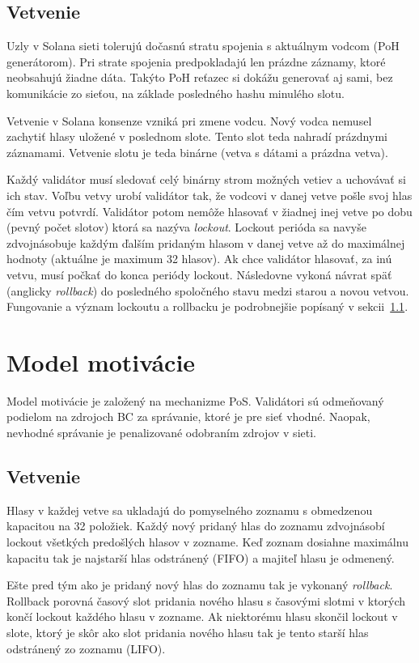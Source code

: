 \subsection{Vetvenie}
Uzly v Solana sieti tolerujú dočasnú stratu spojenia s aktuálnym vodcom (PoH generátorom). Pri strate spojenia predpokladajú len prázdne záznamy, ktoré neobsahujú žiadne dáta. Takýto PoH reťazec si dokážu generovať aj sami, bez komunikácie zo sieťou, na základe posledného hashu minulého slotu.

Vetvenie v Solana konsenze vzniká pri zmene vodcu. Nový vodca nemusel zachytiť hlasy uložené v poslednom slote. Tento slot teda nahradí prázdnymi záznamami. Vetvenie slotu je teda binárne (vetva s dátami a prázdna vetva). 

Každý validátor musí sledovať celý binárny strom možných vetiev a uchovávať si ich stav. Voľbu vetvy urobí validátor tak, že vodcovi v danej vetve pošle svoj hlas čím vetvu potvrdí. Validátor potom nemôže hlasovať v žiadnej inej vetve po dobu (pevný počet slotov) ktorá sa nazýva \textit{lockout}. Lockout perióda sa navyše zdvojnásobuje každým ďalším pridaným hlasom v danej vetve až do maximálnej hodnoty (aktuálne je maximum 32 hlasov). Ak chce validátor hlasovať, za inú vetvu, musí počkať do konca periódy lockout. Následovne vykoná návrat späť (anglicky \textit{rollback}) do posledného spoločného stavu medzi starou a novou vetvou. Fungovanie a význam lockoutu a rollbacku je podrobnejšie popísaný v sekcii~\ref{subsec:solana-branch}.

\section{Model motivácie}\label{sec:solana-motiv}
Model motivácie je založený na mechanizme PoS. Validátori sú odmeňovaný podielom na zdrojoch BC za správanie, ktoré je pre sieť vhodné. Naopak, nevhodné správanie je penalizované odobraním zdrojov v sieti.

\subsection{Vetvenie}\label{subsec:solana-branch}
Hlasy v každej vetve sa ukladajú do pomyselného zoznamu s obmedzenou kapacitou na 32 položiek. Každý nový pridaný hlas do zoznamu zdvojnásobí lockout všetkých predošlých hlasov v zozname. Keď zoznam dosiahne maximálnu kapacitu tak je najstarší hlas odstránený (FIFO) a majiteľ hlasu je odmenený.

Ešte pred tým ako je pridaný nový hlas do zoznamu tak je vykonaný \textit{rollback}. Rollback porovná časový slot pridania nového hlasu s časovými slotmi v ktorých končí lockout každého hlasu v zozname. Ak niektorému hlasu skončil lockout v slote, ktorý je skôr ako slot pridania nového hlasu tak je tento starší hlas odstránený zo zoznamu (LIFO).

